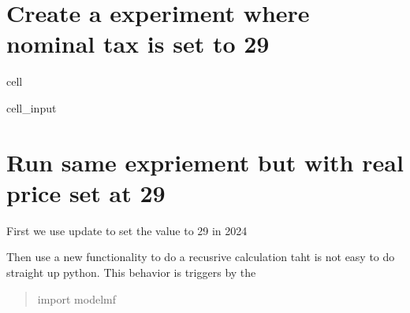 \documentclass[letterpaper,10pt,english]{jupyterBook}
\begin{document}
\section{Create a experiment  where nominal tax is set to 29}
\label{\detokenize{content/howto/modifymodel/create_real_model:create-a-experiment-where-nominal-tax-is-set-to-29}}
\begin{sphinxuseclass}{cell}\begin{sphinxVerbatimInput}

\begin{sphinxuseclass}{cell_input}
\begin{sphinxVerbatim}[commandchars=\\\{\}]
  
  
\end{sphinxVerbatim}

\end{sphinxuseclass}\end{sphinxVerbatimInput}

\end{sphinxuseclass}

\section{Run same expriement but with real price set at 29}
\label{\detokenize{content/howto/modifymodel/create_real_model:run-same-expriement-but-with-real-price-set-at-29}}
\sphinxAtStartPar
First we use update to set the value to 29 in 2024

\sphinxAtStartPar
Then use a new functionality  to do a recusrive calculation taht is not easy to do straight up python. This behavior is
triggers by the
\begin{quote}

\sphinxAtStartPar
import modelmf
\end{quote}
\end{document}

